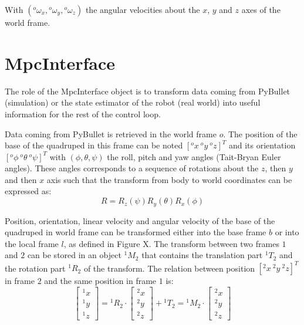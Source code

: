 \documentclass[a4paper,11pt]{article}
\newcommand{\fM}[2]{{}^{#1}\!M_{#2}}
\begin{document}
With $({}^o\!\omega_x, {}^o\!\omega_y, {}^o\!\omega_z)$ the angular velocities about the $x$, $y$ and $z$ axes of the world frame.


\section{MpcInterface}

The role of the MpcInterface object is to transform data coming from PyBullet (simulation) or the state estimator of the robot (real world) into useful information for the rest of the control loop. 

Data coming from PyBullet is retrieved in the world frame $o$. The position of the base of the quadruped in this frame can be noted $[{}^o\!x ~ {}^o\!y ~ {}^o\!z]^T$ and its orientation $[{}^o\!\phi ~ {}^o\!\theta ~ {}^o\!\psi]^T$ with $(\phi, \theta, \psi)$ the roll, pitch and yaw angles (Tait-Bryan Euler angles). These angles corresponds to a sequence of rotations about the $z$, then $y$ and then $x$ axis such that the transform from body to world coordinates can be expressed as:
\begin{equation}
	R = R_z(\psi) R_y(\theta) R_x(\phi)
\end{equation}

Position, orientation, linear velocity and angular velocity of the base of the quadruped in world frame can be transformed either into the base frame $b$ or into the local frame $l$, as defined in Figure X. The transform between two frames $1$ and $2$ can be stored in an object $\fM{1}{2}$ that contains the translation part $^1\!T_2$ and the rotation part $^1\!R_2$ of the transform. The relation between position $[^2\!x ~ ^2\!y ~ ^2\!z]^T$ in frame $2$ and the same position in frame $1$ is:
\begin{equation}
\begin{bmatrix}^1\!x \\ ^1\!y \\ ^1\!z \end{bmatrix} = {}^1\!R_2 \cdot \begin{bmatrix}^2\!x \\ ^2\!y \\ ^2\!z\end{bmatrix} + {}^1\!T_2 = \fM{1}{2} \cdot \begin{bmatrix}^2\!x \\ ^2\!y \\ ^2\!z\end{bmatrix}
\end{equation}  
\end{document}
